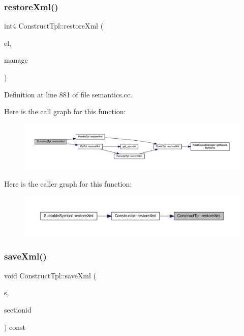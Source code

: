 \subsubsection{\texorpdfstring{restoreXml()}{restoreXml()}}
{\footnotesize\ttfamily int4 Construct\+Tpl\+::restore\+Xml (\begin{DoxyParamCaption}\item[{const \mbox{\hyperlink{class_element}{Element}} $\ast$}]{el,  }\item[{const \mbox{\hyperlink{class_addr_space_manager}{Addr\+Space\+Manager}} $\ast$}]{manage }\end{DoxyParamCaption})}



Definition at line 881 of file semantics.\+cc.

Here is the call graph for this function\+:
\nopagebreak
\begin{figure}[H]
\begin{center}
\leavevmode
\includegraphics[width=350pt]{class_construct_tpl_a0e22f6df1e5fb8ab5fe763b3f68dd1fa_cgraph}
\end{center}
\end{figure}
Here is the caller graph for this function\+:
\nopagebreak
\begin{figure}[H]
\begin{center}
\leavevmode
\includegraphics[width=350pt]{class_construct_tpl_a0e22f6df1e5fb8ab5fe763b3f68dd1fa_icgraph}
\end{center}
\end{figure}
\mbox{\label{class_construct_tpl_af26ca1f89d087ed17c153b0fefdb8a14}} 
\subsubsection{\texorpdfstring{saveXml()}{saveXml()}}
{\footnotesize\ttfamily void Construct\+Tpl\+::save\+Xml (\begin{DoxyParamCaption}\item[{ostream \&}]{s,  }\item[{int4}]{sectionid }\end{DoxyParamCaption}) const}



